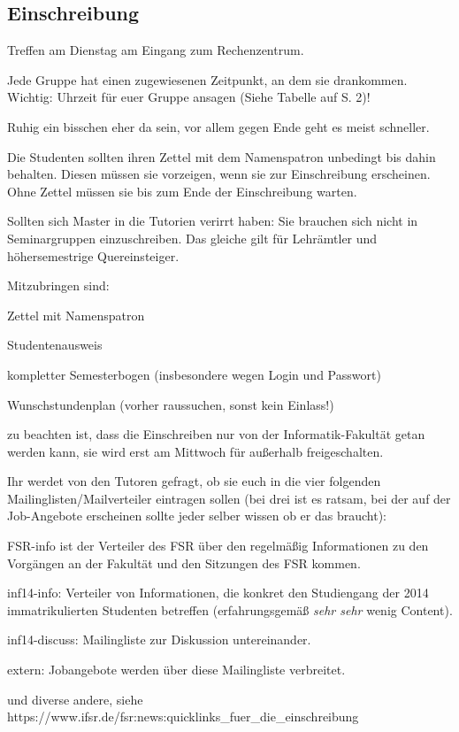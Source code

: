 \documentclass[a4paper,12pt]{report}
\begin{document}
\subsection{Einschreibung}
\begin{itemize*}
	\item Treffen am Dienstag am Eingang zum Rechenzentrum.
	\item Jede Gruppe hat einen zugewiesenen Zeitpunkt, an dem sie drankommen. Wichtig: Uhrzeit für euer Gruppe ansagen (Siehe Tabelle auf S. 2)!
	\item Ruhig ein bisschen eher da sein, vor allem gegen Ende geht es meist schneller.
	\item Die Studenten sollten ihren Zettel mit dem Namenspatron unbedingt bis dahin behalten.
	Diesen müssen sie vorzeigen, wenn sie zur Einschreibung erscheinen. Ohne Zettel müssen sie bis zum Ende der Einschreibung warten.
	\item Sollten sich Master in die Tutorien verirrt haben:
	Sie brauchen sich nicht in Seminargruppen einzuschreiben.
	Das gleiche gilt für Lehrämtler und höhersemestrige Quereinsteiger.
	\item Mitzubringen sind:
		\begin{itemize*}
		\item Zettel mit Namenspatron
		\item Studentenausweis
		\item kompletter Semesterbogen (insbesondere wegen Login und Passwort)
		\item Wunschstundenplan (vorher raussuchen, sonst kein Einlass!)
		\item zu beachten ist, dass die Einschreiben nur von der Informatik-Fakultät getan werden kann, sie wird erst am Mittwoch für außerhalb freigeschalten.
	\end{itemize*}
	\item Ihr werdet von den Tutoren gefragt, ob sie euch in die vier folgenden Mailinglisten/Mailverteiler eintragen sollen (bei drei ist es ratsam, bei der auf der Job-Angebote erscheinen sollte jeder selber wissen ob er das braucht):
		\begin{itemize*}
		\item FSR-info ist der Verteiler des FSR über den regelmäßig Informationen zu den Vorgängen an der Fakultät und den Sitzungen des FSR kommen.
		\item inf14-info: Verteiler von Informationen, die konkret den Studiengang der 2014 immatrikulierten Studenten betreffen (erfahrungsgemäß \textit{sehr sehr} wenig Content).
		\item inf14-discuss: Mailingliste zur Diskussion untereinander.
		\item extern: Jobangebote werden über diese Mailingliste verbreitet.
		\item und diverse andere, siehe \\ https://www.ifsr.de/fsr:news:quicklinks\_fuer\_die\_einschreibung
	\end{itemize*}
\end{itemize*}
\end{document}
